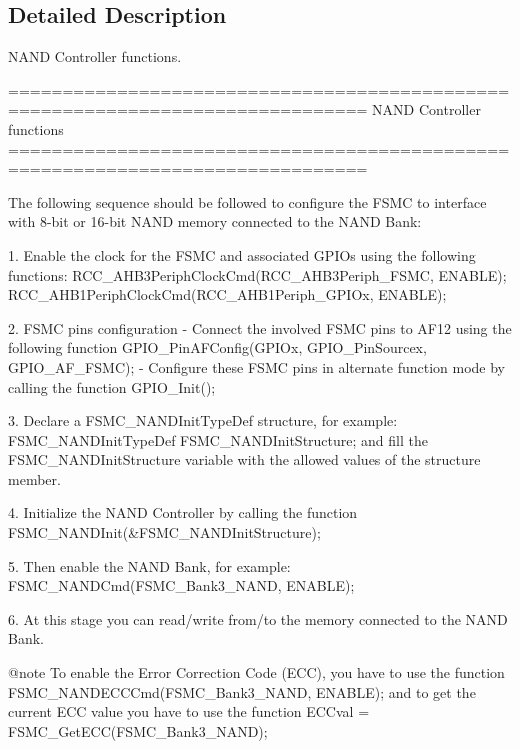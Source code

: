 \subsection{Detailed Description}
N\-A\-N\-D Controller functions. \begin{DoxyVerb} ===============================================================================
                    NAND Controller functions
 ===============================================================================  

 The following sequence should be followed to configure the FSMC to interface with
 8-bit or 16-bit NAND memory connected to the NAND Bank:
 
   1. Enable the clock for the FSMC and associated GPIOs using the following functions:
          RCC_AHB3PeriphClockCmd(RCC_AHB3Periph_FSMC, ENABLE);
          RCC_AHB1PeriphClockCmd(RCC_AHB1Periph_GPIOx, ENABLE);

   2. FSMC pins configuration 
       - Connect the involved FSMC pins to AF12 using the following function 
          GPIO_PinAFConfig(GPIOx, GPIO_PinSourcex, GPIO_AF_FSMC); 
       - Configure these FSMC pins in alternate function mode by calling the function
          GPIO_Init();    
       
   3. Declare a FSMC_NANDInitTypeDef structure, for example:
          FSMC_NANDInitTypeDef  FSMC_NANDInitStructure;
      and fill the FSMC_NANDInitStructure variable with the allowed values of
      the structure member.
      
   4. Initialize the NAND Controller by calling the function
          FSMC_NANDInit(&FSMC_NANDInitStructure); 

   5. Then enable the NAND Bank, for example:
          FSMC_NANDCmd(FSMC_Bank3_NAND, ENABLE);  

   6. At this stage you can read/write from/to the memory connected to the NAND Bank. 
   
@note To enable the Error Correction Code (ECC), you have to use the function
          FSMC_NANDECCCmd(FSMC_Bank3_NAND, ENABLE);  
      and to get the current ECC value you have to use the function
          ECCval = FSMC_GetECC(FSMC_Bank3_NAND); \end{DoxyVerb}
 

